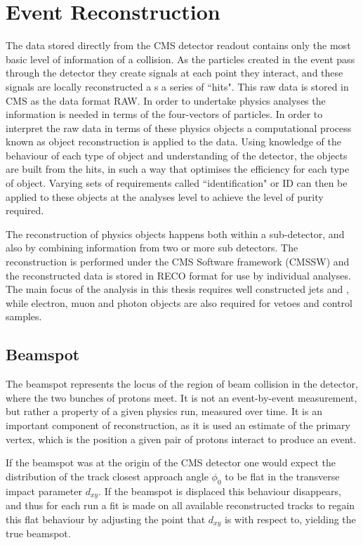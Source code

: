 \chapter{Event Reconstruction}
\label{ch:objects}
The data stored directly from the CMS detector readout contains only the most basic level of information of a collision. As the particles created in the event pass through the detector they create signals at each point they interact, and these signals are locally reconstructed a s a series of ``hits". This raw data is stored in CMS as the data format RAW. In order to undertake physics analyses the information is needed in terms of the four-vectors of particles. In order to interpret the raw data in terms of these physics objects a computational process known as object reconstruction is applied to the data. Using knowledge of the behaviour of each type of object and understanding of the detector, the objects are built from the hits, in such a way that optimises the efficiency for each type of object. Varying sets of requirements called ``identification" or ID can then be applied to these objects at the analyses level to achieve the level of purity required. 

The reconstruction of physics objects happens both within a sub-detector, and also by combining information from two or more sub detectors. The reconstruction is performed under the CMS Software framework (CMSSW) and the reconstructed data is stored in RECO format for use by individual analyses. The main focus of the analysis in this thesis requires well constructed jets and \met, while electron, muon and photon objects are also required for vetoes and control samples. 

\section{Beamspot}

The beamspot represents the locus of the region of beam collision in the detector, where the two bunches of protons meet. It is not an event-by-event measurement, but rather a property of a given physics run, measured over time. It is an important component of reconstruction, as it is used an estimate of the primary vertex, which is the position a given pair of  protons interact to produce an event.

 If the beamspot was at the origin of the CMS detector one would expect the distribution of the track closest approach angle $\phi_{0}$ to be flat in the transverse impact parameter $d_{xy}$. If the beamspot is displaced this behaviour disappears, and thus for each run a fit is made on all available reconstructed tracks to regain this flat behaviour by adjusting the point that $d_{xy}$ is with respect to, yielding the true beamspot. 
 
